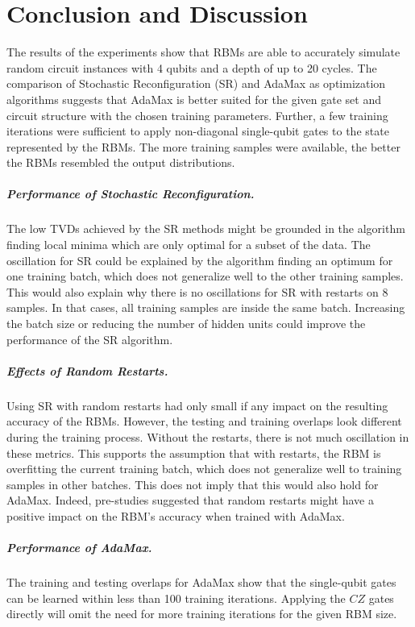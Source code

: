 \chapter{Conclusion and Discussion}
\label{sec:discussion}

The results of the experiments show that RBMs are able to accurately simulate random circuit 
instances with 4 qubits and a depth of up to 20 cycles. The comparison of 
Stochastic Reconfiguration (SR) and AdaMax as optimization algorithms suggests that 
AdaMax is better suited for the given gate set and circuit structure with the chosen training 
parameters. Further, a few training iterations were sufficient to apply non-diagonal 
single-qubit gates to the state represented by the RBMs. The more training samples
were available, the better the RBMs resembled the output distributions.

\paragraph{Performance of Stochastic Reconfiguration.}
The low TVDs achieved by the SR methods might be grounded in the algorithm finding 
local minima which are only optimal for a subset of the data. The oscillation for SR could be explained by the algorithm finding an 
optimum for one training batch, which does not generalize well to the other training samples.
This would also explain why there is no oscillations for SR with restarts on 8 samples. In that
cases, all training samples are inside the same batch. Increasing the batch size or reducing the 
number of hidden units could improve the performance of the SR algorithm.

\paragraph{Effects of Random Restarts.}
Using SR with random restarts had only small if any 
impact on the resulting accuracy of the RBMs. However, the testing and training overlaps 
look different during the training process. Without the restarts, there is not much 
oscillation in these metrics. This supports the assumption that with restarts, the 
RBM is overfitting the current training batch, which does not generalize well to training 
samples in other batches. This does not imply that this would also 
hold for AdaMax. Indeed, pre-studies suggested that random restarts might have a positive 
impact on the RBM's accuracy when trained with AdaMax.

\paragraph{Performance of AdaMax.}
The training and testing overlaps for AdaMax show that the single-qubit gates can 
be learned within less than 100 training iterations. Applying 
the $CZ$ gates directly will omit the need for more training iterations for the given RBM size.

